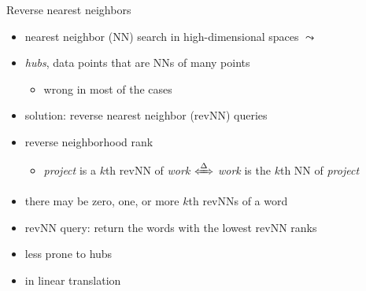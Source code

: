 \documentclass[10pt]{beamer}%
\newcommand{\bull}[1]{\begin{itemize}\item #1 \end{itemize}}
\begin{document}
\begin{frame}{Reverse nearest neighbors}
  \begin{itemize}
    \item nearest neighbor (NN) search in high-dimensional spaces $\leadsto$
    \item \emph{hubs}, data points that are NNs of many points
      \bull{wrong in most of the cases  \citep{Radovanovic:2010}}
    \item solution: reverse nearest neighbor (revNN) queries \\ \citep{Korn:2000}
    \item reverse neighborhood rank
      \bull{\emph{project} is a $k$th revNN of \emph{work}
      $\xLeftrightarrow\Delta$
      \emph{work} is the $k$th NN of \emph{project}}
    \item there may be zero, one, or more $k$th revNNs of a word
    \item revNN query: return the words with the lowest revNN ranks
    \item less prone to hubs
    \item in linear translation \citep{Dinu:2015,Lazaridou:2015}
  \end{itemize}
\end{frame}

\end{document}
